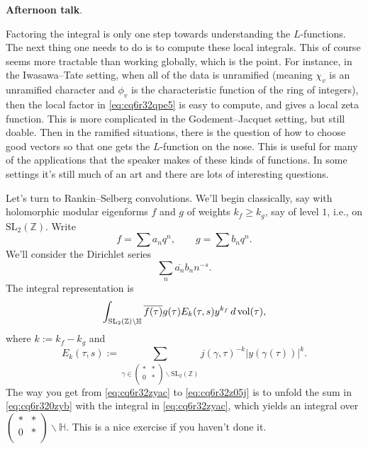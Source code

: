 \documentclass[reqno]{amsart} 
\begin{document}
\textbf{Afternoon talk}.

Factoring the integral is only one step towards understanding the $L$-functions.  The next thing one needs to do is to compute these local integrals.  This of course seems more tractable than working globally, which is the point.  For instance, in the Iwasawa--Tate setting, when all of the data is unramified (meaning $\chi_v$ is an unramified character and $\phi_v$ is the characteristic function of the ring of integers), then the local factor in \eqref{eq:cq6r32qpe5} is easy to compute, and gives a local zeta function.  This is more complicated in the Godement--Jacquet setting, but still doable.  Then in the ramified situations, there is the question of how to choose good vectors so that one gets the $L$-function on the nose.  This is useful for many of the applications that the speaker makes of these kinds of functions.  In some settings it's still much of an art and there are lots of interesting questions.

Let's turn to Rankin--Selberg convolutions.  We'll begin classically, say with holomorphic modular eigenforms $f$ and $g$ of weights $k_f \geq k_g$, say of level $1$, i.e., on $\mathrm{SL}_2(\mathbb{Z})$.  Write
\begin{equation*}
  f = \sum a_n q^n, \qquad g = \sum b_n q^n.
\end{equation*}
We'll consider the Dirichlet series
\begin{equation}\label{eq:cq6r32z05j}
  \sum_n \overline{a_n} b_n n^{- s}.
\end{equation}
The integral representation is
\begin{equation}\label{eq:cq6r32zyac}
  \int_{\mathrm{SL}_2(\mathbb{Z}) \backslash \mathbb{H}} \overline{f(\tau)} g(\tau)
  E_k(\tau, s)
  y^{k_f}
  \, d \operatorname{vol}(\tau),
\end{equation}
where $k := k_f - k_g$ and
\begin{equation}\label{eq:cq6r320zyb}
  E_k(\tau, s)
  := \sum_{\gamma \in
    \begin{pmatrix}
      \ast      & \ast \\
      0             & \ast \\
    \end{pmatrix} \backslash \mathrm{SL}_2(\mathbb{Z})}
  j(\gamma, \tau)^{- k} \lvert y(\gamma(\tau)) \rvert^k.
\end{equation}
The way you get from \eqref{eq:cq6r32zyac} to \eqref{eq:cq6r32z05j} is to unfold the sum in \eqref{eq:cq6r320zyb} with the integral in \eqref{eq:cq6r32zyac}, which yields an integral over $
\begin{pmatrix}
  \ast  & \ast \\
  0     & \ast \\
\end{pmatrix} \backslash \mathbb{H}$.  This is a nice exercise if you haven't done it.
\end{document}
